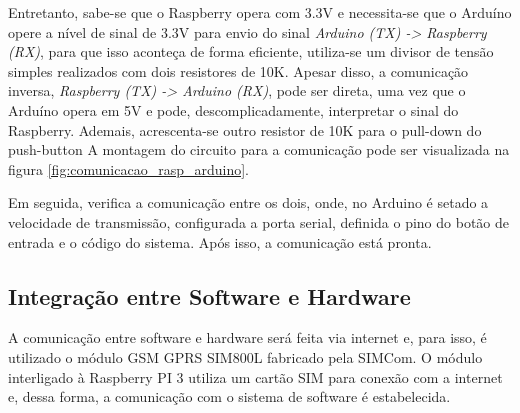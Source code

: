 Entretanto, sabe-se que o Raspberry opera com 3.3V e necessita-se que o Arduíno opere a nível de sinal de 3.3V para envio do sinal \textit{Arduino (TX) -> Raspberry (RX)}, para que isso aconteça de forma eficiente, utiliza-se um divisor de tensão simples realizados com dois resistores de 10K. Apesar disso, a comunicação inversa, \textit{Raspberry (TX) -> Arduino (RX)}, pode ser direta, uma vez que o Arduíno opera em 5V e pode, descomplicadamente, interpretar o sinal do Raspberry. Ademais, acrescenta-se outro resistor de 10K para o pull-down do push-button A montagem do circuito para a comunicação pode ser visualizada na figura \ref{fig:comunicacao_rasp_arduino}.


Em seguida, verifica a comunicação entre os dois, onde, no Arduino é setado a velocidade de transmissão, configurada a porta serial, definida o pino do botão de entrada e o código do sistema. Após isso, a comunicação está pronta.


\subsection{Integração entre Software e Hardware}
A comunicação entre software e hardware será feita via internet e, para isso, é utilizado o módulo GSM GPRS SIM800L fabricado pela SIMCom. O módulo interligado à Raspberry PI 3 utiliza um cartão SIM para conexão com a internet e, dessa forma, a comunicação com o sistema de software é estabelecida.

